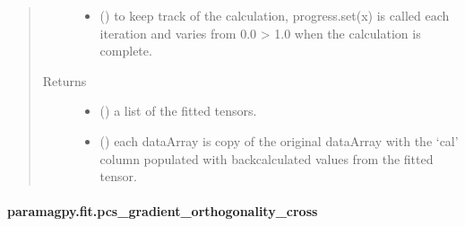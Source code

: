 \documentclass[a4paper,10pt,english,openany,oneside]{sphinxmanual}
\begin{document}
\begin{fulllineitems}
\begin{quote}
\begin{description}
\begin{itemize}
\item {} 
\sphinxAtStartPar
{} (\sphinxstyleliteralemphasis{\sphinxupquote{, }}) \textendash{} to keep track of the calculation, progress.set(x) is called each
iteration and varies from 0.0 \sphinxhyphen{}\textgreater{} 1.0 when the calculation is complete.

\end{itemize}

\item[{Returns}] \leavevmode
\sphinxAtStartPar
\begin{itemize}
\item {} 
\sphinxAtStartPar
{} () \textendash{} a list of the fitted tensors.

\item {} 
\sphinxAtStartPar
{} () \textendash{} each dataArray is copy of the original dataArray with
the ‘cal’ column populated with back\sphinxhyphen{}calculated values from the
fitted tensor.

\end{itemize}


\end{description}\end{quote}

\end{fulllineitems}



\paragraph{paramagpy.fit.pcs\_gradient\_orthogonality\_cross}
\label{\detokenize{reference/generated/paramagpy.fit.pcs_gradient_orthogonality_cross:paramagpy-fit-pcs-gradient-orthogonality-cross}}\label{\detokenize{reference/generated/paramagpy.fit.pcs_gradient_orthogonality_cross::doc}}
\end{document}

